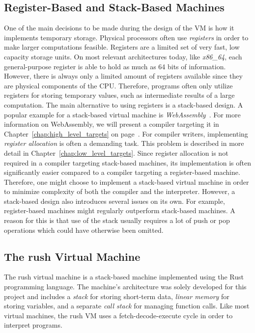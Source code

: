\subsection{Register-Based and Stack-Based Machines}

One of the main decisions to be made during the design of the VM is how it implements temporary storage.
Physical processors often use \emph{registers} in order to make larger computations feasible.
Registers are a limited set of very fast, low capacity storage units.
On most relevant architectures today, like \emph{x86\_64}, each general-purpose register is able to hold as much as 64 bits of information.
However, there is always only a limited amount of registers available since they are physical components of the CPU\@.
Therefore, programs often only utilize registers for storing temporary values, such as intermediate results of a large computation.
The main alternative to using registers is a stack-based design.
A popular example for a stack-based virtual machine is \emph{WebAssembly}~\cite[p.~44]{Sendil2022-fy}.
For more information on WebAssembly, we will present a compiler targeting it in Chapter~\ref{chap:high_level_targets} on page~\pageref{sec:wasm}.
For compiler writers, implementing \emph{register allocation} is often a demanding task.
This problem is described in more detail in Chapter~\ref{chap:low_level_targets}.
Since register allocation is not required in a compiler targeting stack-based machines, its implementation is often significantly easier compared to a compiler targeting a register-based machine.
Therefore, one might choose to implement a stack-based virtual machine in order to minimize complexity of both the compiler and the interpreter.
However, a stack-based design also introduces several issues on its own.
For example, register-based machines might regularly outperform stack-based machines.
A reason for this is that use of the stack usually requires a lot of push or pop operations which could have otherwise been omitted.

\subsection{The rush Virtual Machine}

The rush virtual machine is a stack-based machine implemented using the Rust programming language.
The machine's architecture was solely developed for this project and includes a \emph{stack} for storing short-term data, \emph{linear memory} for storing variables, and a separate \emph{call stack} for managing function calls.
Like most virtual machines, the rush VM uses a fetch-decode-execute cycle in order to interpret programs.

